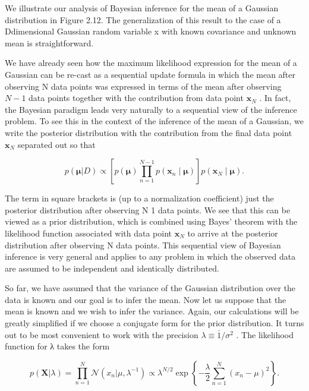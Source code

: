 \documentclass[
  10
]{article}
\begin{document}
We illustrate our analysis of Bayesian inference for the mean of a
Gaussian distribution in Figure 2.12. The generalization of this result
to the case of a Ddimensional Gaussian random variable x with known
covariance and unknown mean is straightforward.

We have already seen how the maximum likelihood expression for the mean
of a Gaussian can be re-cast as a sequential update formula in which the
mean after observing N data points was expressed in terms of the mean
after observing \(N - 1\) data points together with the contribution
from data point \(\mathbf { x } _ { N }\) . In fact, the Bayesian
paradigm leads very naturally to a sequential view of the inference
problem. To see this in the context of the inference of the mean of a
Gaussian, we write the posterior distribution with the contribution from
the final data point \(\mathbf { x } _ { N }\) separated out so that

\[
p (\boldsymbol {\mu} | D) \propto \left[ p (\boldsymbol {\mu}) \prod_ {n = 1} ^ {N - 1} p \left(\mathbf {x} _ {n} \mid \boldsymbol {\mu}\right) \right] p \left(\mathbf {x} _ {N} \mid \boldsymbol {\mu}\right).\tag{2.144}
\]

The term in square brackets is (up to a normalization coefficient) just
the posterior distribution after observing N 1 data points. We see that
this can be viewed as a prior distribution, which is combined using
Bayes' theorem with the likelihood function associated with data point
\(\mathbf { x } _ { N }\) to arrive at the posterior distribution after
observing N data points. This sequential view of Bayesian inference is
very general and applies to any problem in which the observed data are
assumed to be independent and identically distributed.

So far, we have assumed that the variance of the Gaussian distribution
over the data is known and our goal is to infer the mean. Now let us
suppose that the mean is known and we wish to infer the variance. Again,
our calculations will be greatly simplified if we choose a conjugate
form for the prior distribution. It turns out to be most convenient to
work with the precision \(\lambda \equiv \bar { 1 } / \sigma ^ { 2 }\) .
The likelihood function for λ takes the form

\[
p (\mathbf {X} | \lambda) = \prod_ {n = 1} ^ {N} \mathcal {N} (x _ {n} | \mu , \lambda^ {- 1}) \propto \lambda^ {N / 2} \exp \left\{- \frac {\lambda}{2} \sum_ {n = 1} ^ {N} (x _ {n} - \mu) ^ {2} \right\}.\tag{2.145}
\]
\end{document}
